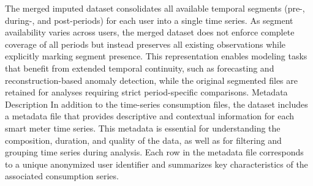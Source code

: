 ﻿\documentclass[12pt,reqno, twoside]{amsbook}
\makeatletter
\numberwithin{figure}{chapter}
\numberwithin{table}{chapter}
\numberwithin{equation}{chapter}
\def\subsection{\@startsection{subsection}{2}%
      \z@{.5\linespacing\@plus.7\linespacing}{.25\linespacing}%
      {\normalfont\bfseries\flushleft}}
\theoremstyle{plain}
\numberwithin{equation}{chapter}
\numberwithin{section}{chapter}
\makeatother
\begin{document}
\noindent
\noindent
The merged imputed dataset consolidates all available temporal segments (pre-, during-, and post-periods) for each user into a single time series. As segment availability varies across users, the merged dataset does not enforce complete coverage of all periods but instead preserves all existing observations while explicitly marking segment presence. This representation enables modeling tasks that benefit from extended temporal continuity, such as forecasting and reconstruction-based anomaly detection, while the original segmented files are retained for analyses requiring strict period-specific comparisons.
\subsection{Metadata Description}
\noindent
In addition to the time-series consumption files, the dataset includes a metadata file that provides descriptive and contextual information for each smart meter time series. This metadata is essential for understanding the composition, duration, and quality of the data, as well as for filtering and grouping time series during analysis. Each row in the metadata file corresponds to a unique anonymized user identifier and summarizes key characteristics of the associated consumption series.
\end{document}
